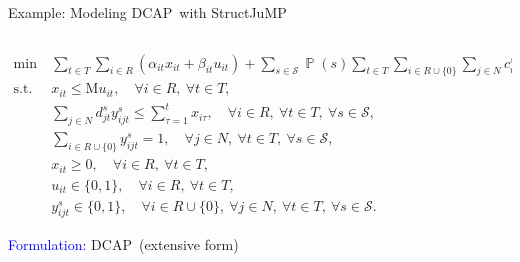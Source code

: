 \documentclass[usenames,dvipsnames]{beamer}
\newcommand{\structjump}{\textsf{StructJuMP}}
\newcommand{\dcap}{\textsf{DCAP}}
\DeclareMathOperator*{\PP}{\mathbb{P}}
\begin{document}
\begin{frame}[shrink=40]{Example: Modeling \dcap\ with \structjump}
\begin{columns}
	\begin{column}{10cm}
			\vspace{-0.5cm}
			\begin{flushleft}
					\begin{align*}
					\textrm{min}\ &\sum_{t\in T}\sum_{i\in R}\left(\alpha_{it}x_{it}+\beta_{it}u_{it}\right)+\sum_{s\in\mathcal{S}}\PP(s)\sum_{t\in T}\sum_{i\in R\cup\{0\}}\sum_{j\in N}c_{ijt}^{s}y_{ijt}^s	 \\
					\textrm{s.t.}\ & x_{it}\le \textrm{M}u_{it},\quad\forall i\in R,\ \forall t\in T,\\
					&\sum_{j\in N}d_{jt}^s y_{ijt}^s\le\sum_{\tau=1}^{t}x_{i\tau},\quad\forall i\in R,\ \forall t\in T,\ \forall s\in\mathcal{S},\\
					&\sum_{i\in R\cup \{0\}}y_{ijt}^s=1,\quad\forall j\in N,\ \forall t\in T,\ \forall s\in\mathcal{S},  \\
					&x_{it}\ge 0,\quad\forall i\in R,\ \forall t\in T, \\
					&u_{it}\in\{0,1\}, \quad\forall i\in R,\ \forall t\in T,\\
					&y_{ijt}^s\in\{0,1\},\quad\forall i\in R\cup\{0\},\ \forall j\in N,\ \forall t\in T,\ \forall s\in\mathcal{S}.
					\end{align*}
			\end{flushleft}
			\vspace{0.5cm}
			\centering \textcolor{Blue}{Formulation:} \dcap\ (extensive form)
	\end{column}
	

\end{columns}
\end{frame}
\end{document}
